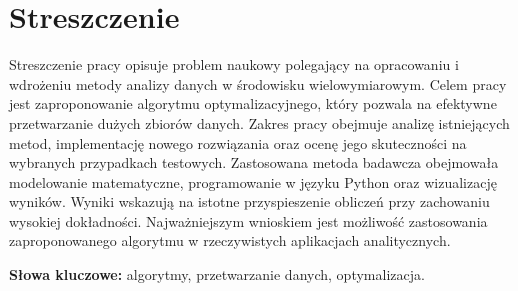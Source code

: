 \chapter*{Streszczenie}
Streszczenie pracy opisuje problem naukowy polegający na opracowaniu i wdrożeniu metody analizy danych w środowisku wielowymiarowym.
Celem pracy jest zaproponowanie algorytmu optymalizacyjnego, który pozwala na efektywne przetwarzanie dużych zbiorów danych.
Zakres pracy obejmuje analizę istniejących metod, implementację nowego rozwiązania oraz ocenę jego skuteczności na wybranych przypadkach testowych.
Zastosowana metoda badawcza obejmowała modelowanie matematyczne, programowanie w języku Python oraz wizualizację wyników.
Wyniki wskazują na istotne przyspieszenie obliczeń przy zachowaniu wysokiej dokładności.
Najważniejszym wnioskiem jest możliwość zastosowania zaproponowanego algorytmu w rzeczywistych aplikacjach analitycznych.

\textbf{Słowa kluczowe:} algorytmy, przetwarzanie danych, optymalizacja.
